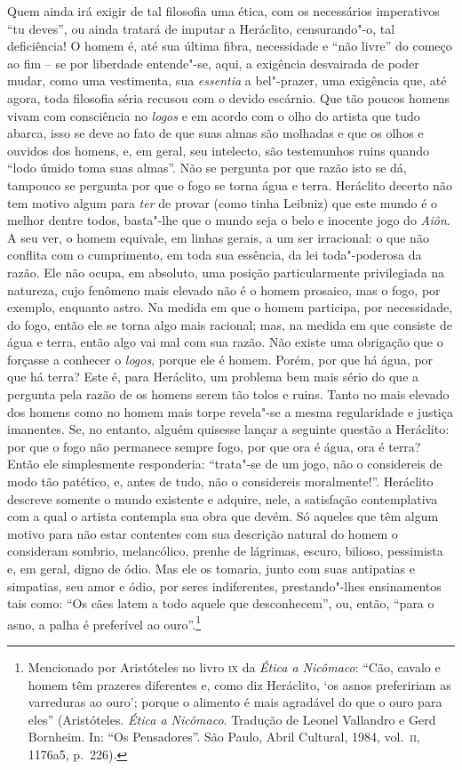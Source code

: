 Quem ainda irá exigir de tal filosofia uma ética, com os necessários
imperativos ``tu deves'', ou ainda tratará de
imputar a Heráclito, censurando"-o, tal deficiência! O homem é, até sua
última fibra, necessidade e ``não livre'' do
começo ao fim -- se por liberdade entende"-se, aqui, a exigência
desvairada de poder mudar, como uma vestimenta, sua \textit{essentia}
a bel"-prazer, uma exigência que, até agora, toda filosofia séria
recusou com o devido escárnio. Que tão poucos homens vivam com
consciência no \textit{logos} e em acordo com o olho do artista que
tudo abarca, isso se deve ao fato de que suas almas são molhadas e que
os olhos e ouvidos dos homens, e, em geral, seu intelecto, são
testemunhos ruins quando ``lodo úmido toma suas
almas''. Não se pergunta por que razão isto se dá, tampouco se pergunta por que o fogo se torna água e terra.
Heráclito decerto não tem motivo algum para \textit{ter} de provar
(como tinha Leibniz) que este mundo é o melhor dentre todos,
basta"-lhe que o mundo seja o belo e inocente jogo do \textit{Aiôn}.
A seu ver, o homem equivale, em linhas gerais, a um ser
irracional: o que não conflita com o cumprimento, em toda sua essência,
da lei toda"-poderosa da razão. Ele não ocupa, em absoluto, uma posição
particularmente privilegiada na natureza, cujo fenômeno mais elevado
não é o homem prosaico, mas o fogo, por exemplo, enquanto astro. Na medida
em que o homem participa, por necessidade, do fogo,
então ele se torna algo mais racional; mas, na medida em que
consiste de água e terra, então algo vai mal com sua razão. Não existe
uma obrigação que o forçasse a conhecer o \textit{logos}, porque ele é
homem. Porém, por que há água, por que há terra? Este é, para
Heráclito, um problema bem mais sério do que a pergunta pela razão de
os homens serem tão tolos e ruins. Tanto no mais elevado dos homens
como no homem mais torpe revela"-se a mesma regularidade e justiça imanentes. 
Se, no entanto, alguém quisesse lançar a seguinte questão a
Heráclito: por que o fogo não permanece sempre fogo, por que ora é
água, ora é terra? Então ele simplesmente responderia:
``trata"-se de um jogo, não o considereis de modo tão
patético, e, antes de tudo, não o considereis
moralmente!''. Heráclito descreve somente o mundo
existente e adquire, nele, a satisfação contemplativa com a qual o
artista contempla sua obra que devém. Só aqueles que têm algum motivo
para não estar contentes com sua descrição natural do homem o
consideram sombrio, melancólico, prenhe de lágrimas, escuro, bilioso,
pessimista e, em geral, digno de ódio. Mas ele os tomaria, junto com
suas antipatias e simpatias, seu amor e ódio, por seres indiferentes,
prestando"-lhes ensinamentos tais como: ``Os cães latem a
todo aquele que desconhecem'', ou, então,
``para o asno, a palha é preferível ao
ouro''.\footnote{ Mencionado por Aristóteles no livro \textsc{ix}
da \textit{Ética a Nicômaco}: ``Cão, cavalo e homem têm prazeres
diferentes e, como diz Heráclito, `os asnos prefeririam as varreduras
ao ouro'; porque o alimento é mais agradável do que o ouro para eles''
(Aristóteles. \textit{Ética a Nicômaco}. Tradução de Leonel Vallandro e
Gerd Bornheim. In: ``Os Pensadores''. São Paulo, Abril Cultural, 1984,
vol.~\textsc{ii}, 1176a5, p.~226).}

